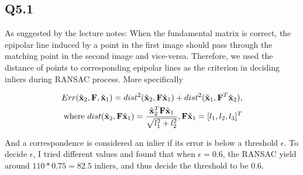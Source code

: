 \documentclass[11pt]{article}
\begin{document}
\subsection*{Q5.1}

As suggested by the lecture notes: When the fundamental matrix is correct, the epipolar line induced by a point in the first image should pass through the matching point in the second image and vice-versa.
Therefore, we used the distance of points to corresponding epipolar lines as the criterion in deciding inliers during RANSAC process. More specifically

\begin{align}
  Err(\tilde{\mathbf{x}}_2, \mathbf{F}, \tilde{\mathbf{x}}_1) = dist^2(\tilde{\mathbf{x}}_2, \mathbf{F} \tilde{\mathbf{x}}_1) + dist^2(\tilde{\mathbf{x}}_1, \mathbf{F}^T \tilde{\mathbf{x}}_2),  \\
  \textrm{where } dist(\tilde{\mathbf{x}}_2, \mathbf{F} \tilde{\mathbf{x}}_1) = \frac{\tilde{\mathbf{x}}_2^T \mathbf{F} \tilde{\mathbf{x}}_1}{\sqrt{l_1^2 + l_2^2}}, \mathbf{F} \tilde{\mathbf{x}}_1=[l_1, l_2, l_3]^T
\end{align}

And a correspondence is considered an inlier if its error is below a threshold $\epsilon$. To decide $\epsilon$, I tried different values and found that when $\epsilon=0.6$, the RANSAC yield around $110*0.75=82.5$ inliers, and thus decide the threshold to be 0.6.
\end{document}
